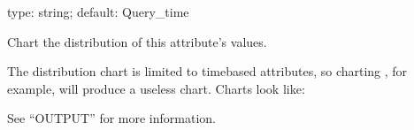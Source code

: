\documentclass[letterpaper,10pt,english]{sphinxmanual}
\begin{document}
\begin{fulllineitems}
\label{\detokenize{mariadb-query-digest:cmdoption-mariadb-query-digest-report-histogram}}
\sphinxAtStartPar
type: string; default: Query\_time

\sphinxAtStartPar
Chart the distribution of this attribute’s values.

\sphinxAtStartPar
The distribution chart is limited to time\sphinxhyphen{}based attributes, so charting
, for example, will produce a useless chart.  Charts look
like:

\begin{sphinxVerbatim}[commandchars=\\\{\}]
\end{sphinxVerbatim}

\sphinxAtStartPar
See “OUTPUT” for more information.

\end{fulllineitems}

\end{document}
